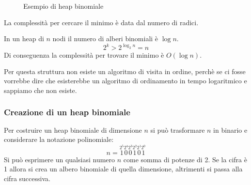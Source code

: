 \documentclass[a4paper]{article}
\begin{document}
\begin{figure}[H]
  \centering
  \caption{Esempio di heap binomiale}
\end{figure}
\noindent
La complessità per cercare il minimo è data dal numero di radici.

In un heap di \( n \) nodi il numero di alberi binomiali è \( \log n \).
\[
  2^k > 2^{\log_2 n} = n
\] 
Di conseguenza la complessità per trovare il minimo è \( O(\log n) \).

\vspace{1em}
\noindent
Per questa struttura non esiste un algoritmo di visita in ordine, perchè se ci fosse
vorrebbe dire che esisterebbe un algoritmo di ordinamento in tempo logaritmico e
sappiamo che non esiste.

\subsubsection{Creazione di un heap binomiale}
Per costruire un heap binomiale di dimensione \( n \) si può trasformare \( n \) in
binario e considerare la notazione polinomiale:
\[
  n = \stackrel{2^5}{1} \stackrel{2^4}{0} \stackrel{2^3}{0} \stackrel{2^2}{1} \stackrel{2^1}{0} \stackrel{2^0}{1}
\] 
Si può esprimere un qualsiasi numero \( n \) come somma di potenze di 2. Se la cifra
è 1 allora si crea un albero binomiale di quella dimensione, altrimenti si passa alla
cifra successiva.
\end{document}

